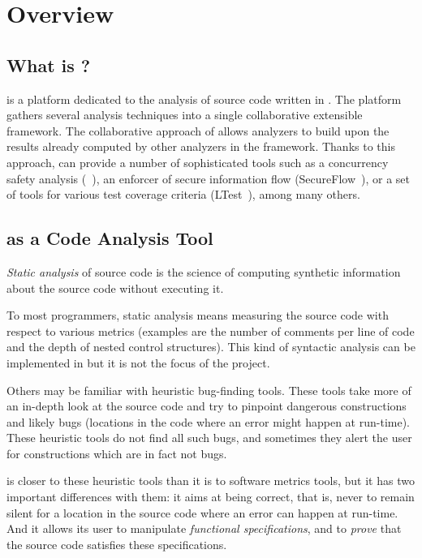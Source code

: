 \chapter{Overview}
\label{user-overview}

\section{What is \FramaC?}

\FramaC is a platform dedicated to the analysis of source code written in
. The \FramaC platform gathers several analysis techniques into
a single collaborative extensible framework. The collaborative approach of
\FramaC allows analyzers to build upon the results already computed by
other analyzers in the framework. Thanks to this approach, \FramaC can provide
a number of sophisticated tools such as a concurrency safety analysis
(\mthread~\cite{mthread}),
an enforcer of secure information flow (SecureFlow~\cite{secureflow1,secureflow2}),
or a set of tools for various test coverage criteria (LTest~\cite{ltest}), among many others.

\section{\FramaC as a Code Analysis Tool}

\emph{Static analysis} of source code is the science of computing synthetic
information about the source code without executing it.

To most programmers, static analysis means measuring the source code with
respect to various metrics (examples are the number of comments per line of
code and the depth of nested control structures). This kind of syntactic
analysis can be implemented in \FramaC but it is not the focus of the project.

Others may be familiar with heuristic bug-finding tools. These tools take more
of an in-depth look at the source code and try to pinpoint dangerous
constructions and likely bugs (locations in the code where an error might
happen at run-time). These heuristic tools do not find all such bugs, and
sometimes they alert the user for constructions which are in fact not bugs.

\FramaC is closer to these heuristic tools than it is to software metrics
tools, but it has two important differences with them: it aims at being
correct, that is, never to remain silent for a location in the source code
where an error can happen at run-time. And it allows its user to manipulate
\emph{functional specifications}, and to \emph{prove} that the source code
satisfies these specifications.

